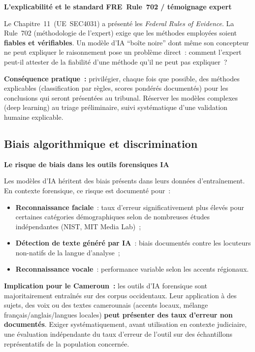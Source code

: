 \begin{boxjuris}
\textbf{L'explicabilité et le standard FRE~Rule~702 / témoignage expert}

Le Chapitre~11~(UE~SEC4031) a présenté les \textit{Federal Rules
of Evidence}. La Rule~702 (méthodologie de l'expert) exige que les
méthodes employées soient \textbf{fiables et vérifiables}. Un modèle
d'IA ``boîte noire'' dont même son concepteur ne peut expliquer le
raisonnement pose un problème direct~: comment l'expert peut-il
attester de la fiabilité d'une méthode qu'il ne peut pas expliquer~?

\textbf{Conséquence pratique~:} privilégier, chaque fois que possible,
des méthodes explicables (classification par règles, scores pondérés
documentés) pour les conclusions qui seront présentées au tribunal.
Réserver les modèles complexes (deep learning) au triage préliminaire,
suivi systématique d'une validation humaine explicable.
\end{boxjuris}

\subsection{Biais algorithmique et discrimination}

\begin{boxalert}
\textbf{Le risque de biais dans les outils forensiques IA}

Les modèles d'IA héritent des biais présents dans leurs données
d'entraînement. En contexte forensique, ce risque est documenté
pour~:
\begin{itemize}
    \item \textbf{Reconnaissance faciale}~: taux d'erreur
          significativement plus élevés pour certaines catégories
          démographiques selon de nombreuses études indépendantes
          (NIST, MIT Media Lab)~;
    \item \textbf{Détection de texte généré par IA}~: biais
          documentés contre les locuteurs non-natifs de la
          langue d'analyse~;
    \item \textbf{Reconnaissance vocale}~: performance variable
          selon les accents régionaux.
\end{itemize}
\textbf{Implication pour le Cameroun~:} les outils d'IA forensique
sont majoritairement entraînés sur des corpus occidentaux.
Leur application à des sujets, des voix ou des textes camerounais
(accents locaux, mélange français/anglais/langues locales)
\textbf{peut présenter des taux d'erreur non documentés}.
Exiger systématiquement, avant utilisation en contexte judiciaire,
une évaluation indépendante du taux d'erreur de l'outil sur des
échantillons représentatifs de la population concernée.
\end{boxalert}

